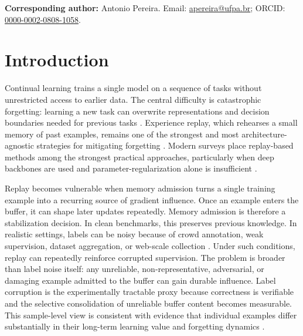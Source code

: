 \documentclass[preprint,12pt]{elsarticle}
\begin{document}
\noindent\textbf{Corresponding author:} Antonio Pereira.
Email: \href{mailto:apereira@ufpa.br}{apereira@ufpa.br};
ORCID: \href{https://orcid.org/0000-0002-0808-1058}{0000-0002-0808-1058}.

\vspace{1em}

\linenumbers

\section{Introduction}

Continual learning trains a single model on a sequence of tasks without unrestricted access to earlier data. The central difficulty is catastrophic forgetting: learning a new task can overwrite representations and decision boundaries needed for previous tasks \cite{McCloskey1989Catastrophic,French1999Catastrophic}. Experience replay, which rehearses a small memory of past examples, remains one of the strongest and most architecture-agnostic strategies for mitigating forgetting \cite{LopezPaz2017GEM,Rolnick2019ExperienceReplay,Chaudhry2019AGEM,Buzzega2020DERPP}. Modern surveys place replay-based methods among the strongest practical approaches, particularly when deep backbones are used and parameter-regularization alone is insufficient \cite{DeLange2022ContinualSurvey,Parisi2019ContinualReview,Wang2024ComprehensiveCLSurvey,Masana2023ClassIncrementalSurvey,VanDeVen2022ThreeTypes}.

Replay becomes vulnerable when memory admission turns a single training example into a recurring source of gradient influence. Once an example enters the buffer, it can shape later updates repeatedly. Memory admission is therefore a stabilization decision. In clean benchmarks, this preserves previous knowledge. In realistic settings, labels can be noisy because of crowd annotation, weak supervision, dataset aggregation, or web-scale collection \cite{Frenay2014LabelNoiseSurvey,Algan2021NoisyLabelsSurvey,Song2023NoisyLabelsSurvey,Wei2022CIFARN}. Under such conditions, replay can repeatedly reinforce corrupted supervision. The problem is broader than label noise itself: any unreliable, non-representative, adversarial, or damaging example admitted to the buffer can gain durable influence. Label corruption is the experimentally tractable proxy because correctness is verifiable and the selective consolidation of unreliable buffer content becomes measurable. This sample-level view is consistent with evidence that individual examples differ substantially in their long-term learning value and forgetting dynamics \cite{Toneva2019ForgettingEvents}.
\end{document}

